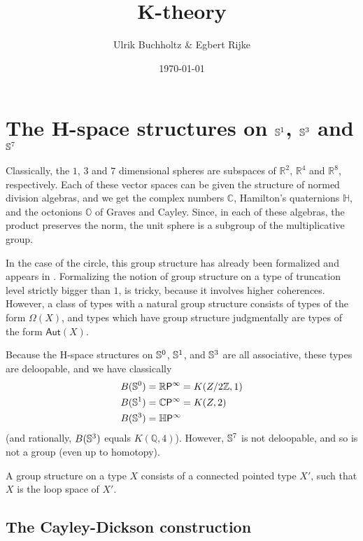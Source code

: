 \documentclass{article}
\title{K-theory}
\date{\today}
\author{Ulrik Buchholtz \& Egbert Rijke}
\begin{document}
\maketitle

\tableofcontents

\section{The H-space structures on $\mathbb{S}^1$, $\mathbb{S}^3$ and $\mathbb{S}^7$}
Classically, the $1$, $3$ and $7$ dimensional spheres are subspaces of $\mathbb{R}^2$,
$\mathbb{R}^4$ and $\mathbb{R}^8$, respectively. Each of these vector spaces can be
given the structure of normed division algebras, and we get the complex numbers
$\mathbb{C}$, Hamilton's quaternions $\mathbb{H}$, and the octonions $\mathbb{O}$
of Graves and Cayley. Since, in each of these algebras, the product preserves
the norm, the unit sphere is a subgroup of the multiplicative group.

In the case of the circle, this group structure has already been formalized and
appears in \cite{TheBook}. Formalizing the notion of group structure on a type
of truncation level strictly bigger than $1$, is tricky, because it involves
higher coherences. However, a class of types with a natural group structure
consists of types of the form $\Omega(X)$, and types which have group structure
judgmentally are types of the form $\mathsf{Aut}(X)$. 

Because the H-space structures on $\mathbb{S}^0$, $\mathbb{S}^1$, and $\mathbb{S}^3$ are
all associative, these types are deloopable, and we have classically
\begin{align*}
  B(\Sn^0) &= \mathbb{R}\mathsf{P}^\infty = K(\mathbb Z/2\mathbb Z,1) \\ 
  B(\Sn^1) &= \mathbb{C}\mathsf{P}^\infty = K(\mathbb Z,2) \\
  B(\Sn^3) &= \mathbb{H}\mathsf{P}^\infty
\end{align*}
(and rationally, $B(\mathbb{S}^3)$ equals $K(\mathbb{Q},4)$). However,
$\mathbb{S}^7$ is not deloopable, and so is not a group (even up to homotopy).

\begin{defn}
A group structure on a type $X$ consists of a connected pointed type $X'$, such
that $X$ is the loop space of $X'$.
\end{defn}

\subsection{The Cayley-Dickson construction}
\end{document}
